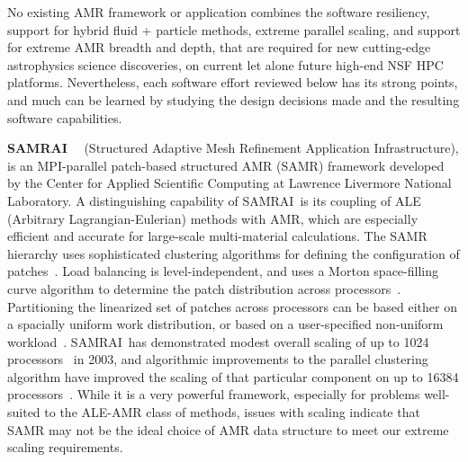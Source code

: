 \documentclass[11pt,letterpaper]{article}
\newcommand{\samrai}{\textsf{SAMRAI}}
\begin{document}
No existing AMR framework or application combines the software
resiliency, support for hybrid fluid + particle methods, extreme
parallel scaling, and support for extreme AMR breadth and depth, that
are required for new cutting-edge astrophysics science discoveries, on
current let alone future high-end NSF HPC platforms.  Nevertheless,
each software effort reviewed below has its strong points, and much
can be learned by studying the design decisions made and the resulting
software capabilities.


\textbf{\samrai}~\cite{WiHo01}~\cite{wwwsamraicode} (Structured
Adaptive Mesh Refinement Application Infrastructure), is an
MPI-parallel patch-based structured AMR (SAMR) framework developed by
the Center for Applied Scientific Computing at Lawrence Livermore
National Laboratory.  A distinguishing capability of \samrai\ is its
coupling of ALE (Arbitrary Lagrangian-Eulerian) methods with AMR,
which are especially efficient and accurate for large-scale
multi-material calculations.  The SAMR hierarchy uses sophisticated
clustering algorithms for defining the configuration of
patches~\cite{GuWi06}.  Load balancing is level-independent, and uses
a Morton space-filling curve algorithm to determine the patch
distribution across processors~\cite{WiHo01}.  Partitioning the
linearized set of patches across processors can be based either on a
spacially uniform work distribution, or based on a user-specified
non-uniform workload~\cite{wwwsamraicode}.  \samrai\ has demonstrated
modest overall scaling of up to 1024 processors~\cite{WiHy03} in 2003,
and algorithmic improvements to the parallel clustering algorithm have
improved the scaling of that particular component on up to 16384
processors~\cite{GuWi06}.  While it is a very powerful framework,
especially for problems well-suited to the ALE-AMR class of methods,
issues with scaling indicate that SAMR may not be the ideal choice of
AMR data structure to meet our extreme scaling requirements.

\end{document}
